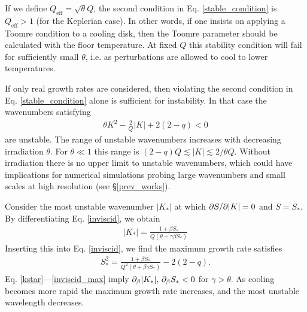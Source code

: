 
If we define $Q_\mathrm{eff}=\sqrt{\theta}Q$, the second condition in
Eq. \ref{stable_condition} is $Q_\mathrm{eff}>1$ (for
the Keplerian case). In other words, if one  
insists on applying a Toomre condition to a cooling disk, then the 
Toomre parameter should be calculated with the floor
temperature. %
At fixed $Q$ this stability condition will fail for sufficiently small 
$\theta$, i.e. as perturbations are allowed to cool to lower
temperatures.    
   

If only real growth rates are considered, then violating the second
condition in Eq. \ref{stable_condition} alone is sufficient for instability. 
In that case the wavenumbers satisfying
\begin{align}
  \theta K^2 - \frac{2}{Q}|K| + 2(2-q) < 0 
\end{align}
are unstable. The range of unstable wavenumbers
increases with decreasing irradiation $\theta$. For $\theta\ll 1$ this range is 
$(2-q)Q\lesssim|K|\lesssim2/\theta Q$. Without irradiation there is no
upper limit to unstable wavenumbers, which could have implications for
numerical simulations probing large wavenumbers and small scales 
at high resolution (see \S\ref{prev_works}). 

Consider the most unstable wavenumber $|K_*|$ at which $\partial S/\partial|K| =
0$ and $S = S_*$. By differentiating Eq. \ref{inviscid}, we obtain 
\begin{align}\label{kstar}
  |K_*| = \frac{1+\beta S_*}{Q\left(\theta + \gamma \beta S_*\right)}
\end{align}
Inserting this into Eq. \ref{inviscid}, we find the maximum growth
rate satisfies
\begin{align}\label{inviscid_max}
  S_*^2 = \frac{1+\beta S_*}{Q^2\left(\theta + \beta\gamma S_*\right)}
  - 2(2-q).
\end{align}
Eq. \ref{kstar}---\ref{inviscid_max} imply $\partial_\beta|K_*|,\,\partial_\beta
S_*<0 $ for $\gamma>\theta$. As cooling becomes more rapid the maximum 
growth rate increases, and the most unstable wavelength decreases. 

